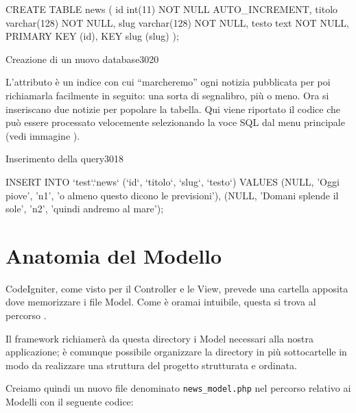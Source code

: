 \begin{code}
CREATE TABLE news (
	id int(11) NOT NULL AUTO_INCREMENT,
	titolo varchar(128) NOT NULL,
	slug varchar(128) NOT NULL,
	testo text NOT NULL,
	PRIMARY KEY (id),
	KEY slug (slug)
);
\end{code}

\begin{img}{Creazione di un nuovo database}{3}{020}
\end{img}

L'attributo  è un indice con cui ``marcheremo'' ogni notizia pubblicata per poi richiamarla facilmente in seguito: una sorta di segnalibro, più o meno. Ora si inseriscano due notizie per popolare la tabella. Qui viene riportato il codice che può essere processato velocemente selezionando la voce SQL dal menu principale (vedi immagine ).

\begin{img}{Inserimento della query}{3}{018}
\end{img}

\begin{code}
INSERT INTO `test`.`news` (`id`, `titolo`, `slug`, `testo`) 
VALUES (NULL, 'Oggi piove', 'n1', 'o almeno questo dicono le previsioni'), 
	(NULL, 'Domani splende il sole', 'n2', 'quindi andremo al mare');
\end{code}

\section*{Anatomia del Modello}
CodeIgniter, come visto per il Controller e le View, prevede una cartella apposita dove memorizzare i file Model. Come è oramai intuibile, questa si trova al percorso .

Il framework richiamerà da questa directory i Model necessari alla nostra applicazione; è comunque possibile organizzare la directory in più sottocartelle in modo da realizzare una struttura del progetto strutturata e ordinata.

Creiamo quindi un nuovo file denominato \verb|news_model.php| nel percorso relativo ai Modelli con il seguente codice:


